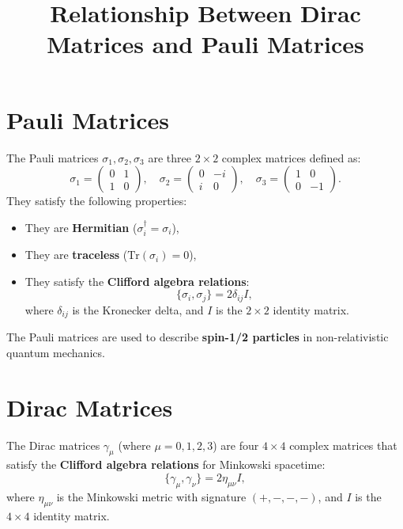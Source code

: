 \documentclass{article}
\begin{document}
\title{Relationship Between Dirac Matrices and Pauli Matrices}
\author{}
\date{}
\maketitle

\section*{Pauli Matrices}

The Pauli matrices $\sigma_1, \sigma_2, \sigma_3$ are three $2 \times 2$
complex matrices defined as: 
\begin{equation*}
\sigma_1 = 
\begin{pmatrix}
0 & 1 \\ 
1 & 0%
\end{pmatrix}%
, \quad \sigma_2 = 
\begin{pmatrix}
0 & -i \\ 
i & 0%
\end{pmatrix}%
, \quad \sigma_3 = 
\begin{pmatrix}
1 & 0 \\ 
0 & -1%
\end{pmatrix}%
. 
\end{equation*}
They satisfy the following properties:

\begin{itemize}
\item They are \textbf{Hermitian} ($\sigma_i^\dagger = \sigma_i$), 

\item They are \textbf{traceless} ($\text{Tr}(\sigma_i) = 0$), 

\item They satisfy the \textbf{Clifford algebra relations}:  
\begin{equation*}
\{ \sigma_i, \sigma_j \} = 2 \delta_{ij} I,  
\end{equation*}
where $\delta_{ij}$ is the Kronecker delta, and $I$ is the $2 \times 2$
identity matrix.
\end{itemize}

The Pauli matrices are used to describe \textbf{spin-1/2 particles} in
non-relativistic quantum mechanics.

\section*{Dirac Matrices}

The Dirac matrices $\gamma_\mu$ (where $\mu = 0, 1, 2, 3$) are four $4
\times 4$ complex matrices that satisfy the \textbf{Clifford algebra
relations} for Minkowski spacetime: 
\begin{equation*}
\{ \gamma_\mu, \gamma_\nu \} = 2 \eta_{\mu\nu} I, 
\end{equation*}
where $\eta_{\mu\nu}$ is the Minkowski metric with signature $(+, -, -, -)$,
and $I$ is the $4 \times 4$ identity matrix.
\end{document}
